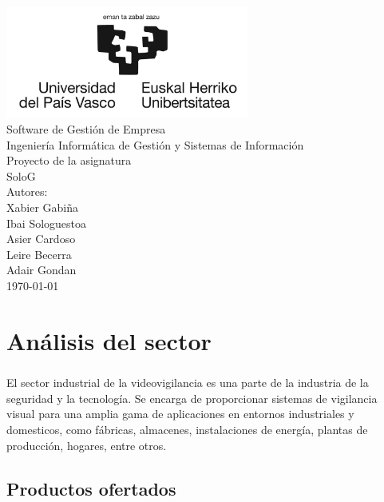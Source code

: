 \documentclass{report}
\begin{document}
    \begin{titlepage}
        \centering
        \includegraphics[width=0.6\textwidth]{./img/logo.jpg}\\
        \vspace{1cm}
        \LARGE Software de Gestión de Empresa\\
        \vspace{0.5cm}
        \Large Ingeniería Informática de Gestión y Sistemas de Información\\
        \vspace{3cm}
        \Huge Proyecto de la asignatura\\
        \huge SoloG\\
        \vspace{2.5cm}
        \Large Autores:\\
        \vspace{0.2cm}
        \large Xabier Gabiña\\
        \large Ibai Sologuestoa\\
        \large Asier Cardoso\\
        \large Leire Becerra\\
        \large Adair Gondan\\
        \vfill
        \today
    \end{titlepage}
    \tableofcontents
    \listoffigures
    \listoftables
    \chapter{Análisis del sector}
      \paragraph*{}{El sector industrial de la videovigilancia es una parte de la industria de la seguridad y la tecnología. Se encarga de proporcionar sistemas de vigilancia visual para una amplia gama de aplicaciones en entornos industriales y domesticos, como fábricas, almacenes, instalaciones de energía, plantas de producción, hogares, entre otros.}
      \section{Productos ofertados}
\end{document}
